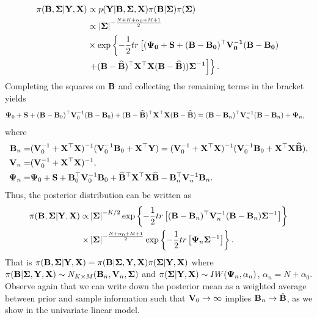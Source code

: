\begin{align*}
	\pi({\bf{B}},{\bf\Sigma}|{\bf{Y}},{\bf{X}})&\propto  p({\bf{Y}}|{\bf{B}},{\bf\Sigma},{\bf{X}}) \pi({\bf{B}}| {\bf \Sigma})\pi({\bf\Sigma})\\
	&\propto \left|{\bf\Sigma} \right|^{-\frac{N+K+\alpha_{0}+M+1}{2}}\\
	&\times\exp\left\lbrace -\frac{1}{2}tr\left[(\bf{\Psi}_{0}+{\bf{S}} +({\bf{B}}-{\bf{B}}_{0})^{\top}{\bf{V}}_{0}^{-1}({\bf{B}}-{\bf{B}}_{0})\right.\right.\\
	&\left.\left.   +({\bf{B}}-\widehat{\bf{B}})^{\top}{\bf{X}}^{\top}{\bf{X}}({\bf{B}}-\widehat{\bf{B}}))\bf{\Sigma}^{-1}\right]\right\rbrace .
\end{align*}
Completing the squares on ${\bf{B}}$ and collecting the remaining terms in the bracket yields
{\footnotesize{
\begin{align*}
	{\bf{\Psi}}_{0}+{\bf{S}} +({\bf{B}}-{\bf{B}}_{0})^{\top}{\bf{V}}_{0}^{-1}({\bf{B}}-{\bf{B}}_{0})+({\bf{B}}-\widehat{\bf{B}})^{\top}{\bf{X}}^{\top}{\bf{X}}({\bf{B}}-\widehat{\bf{B}})
	& = ({\bf{B}}-{\bf{B}}_n)^{\top}{\bf{V}}_n^{-1}({\bf{B}}-{\bf{B}}_n)+{\bf{\Psi}}_n,
\end{align*}
}}
where 
\begin{align*}
	{\bf{B}}_n = &({\bf{V}}_{0}^{-1}+{\bf{X}}^{\top}{\bf{X}})^{-1}({\bf{V}}_{0}^{-1}{\bf{B}}_{0}+{\bf{X}}^{\top}{\bf{Y}})=({\bf{V}}_{0}^{-1}+{\bf{X}}^{\top}{\bf{X}})^{-1}({\bf{V}}_{0}^{-1}{\bf{B}}_{0}+{\bf{X}}^{\top}{\bf{X}}\widehat{\bf{B}}),\\
	{\bf{V}}_n = &({\bf{V}}_{0}^{-1}+{\bf{X}}^{\top}{\bf{X}})^{-1},\\
	{\bf{\Psi}}_n= &{\bf{\Psi}}_{0}+{\bf{S}}+{\bf{B}}_{0}^{\top}{\bf{V}}_{0}^{-1}{\bf{B}}_{0}+\widehat{\bf{B}}^{\top}{\bf{X}}^{\top}{\bf{X}}\widehat{\bf{B}}-{\bf{B}}_n^{\top}{\bf{V}}_n^{-1}{\bf{B}}_n.
\end{align*}
Thus, the posterior distribution can be written as
\begin{align*}
	\pi({\bf{B}},{\bf \Sigma}| {\bf{Y}}, {\bf{X}})\propto &\left|{\bf \Sigma} \right|^{-K/2}\exp\left\lbrace -\frac{1}{2} tr\left[({\bf{B}}-{\bf{B}}_n)^{\top}{\bf{V}}_n^{-1}({\bf{B}}-{\bf{B}}_n)   {\bf \Sigma}^{-1}\right]\right\rbrace \\
	\times & \left|{\bf \Sigma} \right|^{-\frac{N+\alpha_{0}+M+1}{2}}\exp\left\lbrace -\frac{1}{2} tr \left[ {\bf{\Psi}}_n{\bf \Sigma}^{-1}\right] \right\rbrace .
\end{align*}
That is $\pi({\bf{B}},{\bf \Sigma}| {\bf{Y}}, {\bf{X}})=\pi ({\bf{B}}| {\bf \Sigma},{\bf{Y}},{\bf{X}})\pi({\bf \Sigma}| {\bf{Y}},{\bf{X}})$ where $\pi({\bf{B}}| {\bf \Sigma},{\bf{Y}}, {\bf{X}}) \sim N_{K\times M}({\bf{B}}_n,{\bf{V}}_n,{\bf \Sigma})$ and $\pi({\bf \Sigma}| {\bf{Y}},{\bf{X}}) \sim IW({\bf{\Psi}}_n,{\alpha}_n)$, $\alpha_n= N+\alpha_{0}$. Observe again that we can write down the posterior mean as a weighted average between prior and sample information such that ${\bf{V}}_0\rightarrow\infty$ implies ${\bf{B}}_n\rightarrow\hat{{\bf{B}}}$, as we show in the univariate linear model.

